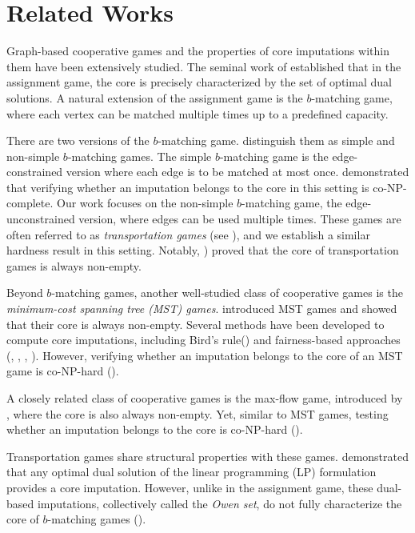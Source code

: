 \section{Related Works}
Graph-based cooperative games and the properties of core imputations within them have been extensively studied. The seminal work of \cite{Shapley1971assignment} established that in the assignment game, the core is precisely characterized by the set of optimal dual solutions. A natural extension of the assignment game is the $b$-matching game, where each vertex can be matched multiple times up to a predefined capacity.

There are two versions of the $b$-matching game. \cite{b_matching_nucleolus} distinguish them as simple and non-simple $b$-matching games. The simple $b$-matching game is the edge-constrained version where each edge is to be matched at most once. \cite{biro2018stable} demonstrated that verifying whether an imputation belongs to the core in this setting is co-NP-complete. Our work focuses on the non-simple $b$-matching game, the edge-unconstrained version, where edges can be used multiple times. These games are often referred to as \textit{transportation games} (see \cite{Transportation_games}), and we establish a similar hardness result in this setting. Notably, \cite{sotomayor1992multiple}) proved that the core of transportation games is always non-empty.

Beyond $b$-matching games, another well-studied class of cooperative games is the \textit{minimum-cost spanning tree (MST) games}. \cite{GranotHuberman1981} introduced MST games and showed that their core is always non-empty. Several methods have been developed to compute core imputations, including Bird’s rule(\cite{Bird1976}) and fairness-based approaches (\cite{Kar}, \cite{feltkamp1994irreducible}, \cite{bergantinos2007fair}, \cite{trudeau2012new}). However, verifying whether an imputation belongs to the core of an MST game is co-NP-hard (\cite{Faigle1997complexity}).

A closely related class of cooperative games is the max-flow game, introduced by \cite{Kalai1982totally}, where the core is also always non-empty. Yet, similar to MST games, testing whether an imputation belongs to the core is co-NP-hard (\cite{Fang2002computational}).

Transportation games share structural properties with these games. \cite{Transportation_games} demonstrated that any optimal dual solution of the linear programming (LP) formulation provides a core imputation. However, unlike in the assignment game, these dual-based imputations, collectively called the \textit{Owen set}, do not fully characterize the core of $b$-matching games (\cite{vazirani2023lpduality}).

